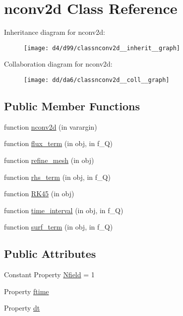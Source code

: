 \hypertarget{classnconv2d}{}\section{nconv2d Class Reference}
\label{classnconv2d}


Inheritance diagram for nconv2d\+:
\nopagebreak
\begin{figure}[H]
\begin{center}
\leavevmode
\texttt{[image: d4/d99/classnconv2d\_\_inherit\_\_graph]}
\end{center}
\end{figure}


Collaboration diagram for nconv2d\+:
\nopagebreak
\begin{figure}[H]
\begin{center}
\leavevmode
\texttt{[image: dd/da6/classnconv2d\_\_coll\_\_graph]}
\end{center}
\end{figure}
\subsection*{Public Member Functions}
\begin{DoxyCompactItemize}
\item 
function \hyperlink{classnconv2d_a86615b1be9cadbaa37a736ab2d671a3d}{nconv2d} (in varargin)
\item 
function \hyperlink{classnconv2d_a7f4737ebd84781291d3250c0b909691a}{flux\+\_\+term} (in obj, in f\+\_\+Q)
\item 
function \hyperlink{classnconv2d_a6d40e2fad544f3363a5d1c5837356ad5}{refine\+\_\+mesh} (in obj)
\item 
function \hyperlink{classnconv2d_ad233ad4c84d3369b1ca520bddffac42b}{rhs\+\_\+term} (in obj, in f\+\_\+Q)
\item 
function \hyperlink{classnconv2d_adc7b4a2d47764e2e6a3f5c1e5ddccd23}{R\+K45} (in obj)
\item 
function \hyperlink{classnconv2d_a92dd63999cc12f1dca10a0b94b0eb78b}{time\+\_\+interval} (in obj, in f\+\_\+Q)
\item 
function \hyperlink{classnconv2d_aa77b913ace97fe22a15a44369fd04b6a}{surf\+\_\+term} (in obj, in f\+\_\+Q)
\end{DoxyCompactItemize}
\subsection*{Public Attributes}
\begin{DoxyCompactItemize}
\item 
Constant Property \hyperlink{classnconv2d_a76d4b7f5283e5965bcda339d915bbce9}{Nfield} = 1
\item 
Property \hyperlink{classnconv2d_ae3d23d76d8bfbb9f5f56a3f0120ba77e}{ftime}
\item 
Property \hyperlink{classnconv2d_a1446865f5d1c8da7297b94f1c7abef9e}{dt}
\end{DoxyCompactItemize}
